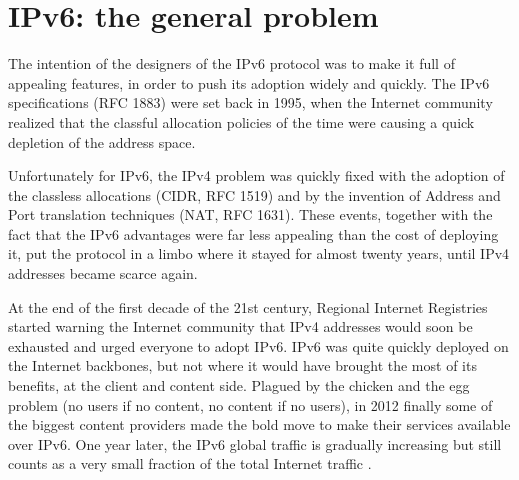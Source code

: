 \section{IPv6: the general problem}

The intention of the designers of the IPv6 protocol was to make it full of appealing features, in order to push its adoption widely and quickly. The IPv6 specifications (RFC 1883) were set back in 1995, when the Internet community realized that the classful allocation policies of the time were causing a quick depletion of the address space. 
\par
Unfortunately for IPv6, the IPv4 problem was quickly fixed with the adoption of the classless allocations (CIDR, RFC 1519) and by the invention of Address and Port translation techniques (NAT, RFC 1631). These events, together with the fact that the IPv6 advantages were far less appealing than the cost of deploying it, put the protocol in a limbo where it stayed for almost twenty years, until IPv4 addresses became scarce again.
\par
At the end of the first decade of the 21st century, Regional Internet Registries started warning the Internet community that IPv4 addresses would soon be exhausted and urged everyone to adopt IPv6. IPv6 was quite quickly deployed on the Internet backbones, but not where it would have brought the most of its benefits, at the client and content side. 
Plagued by the chicken and the egg problem (no users if no content, no content if no users), in 2012 finally some of the 
biggest content providers made the bold move to make their services available over IPv6. 
One year later, the IPv6 global traffic is gradually increasing but still counts as a very small fraction of the 
total Internet traffic \cite{ipv6stat}.


